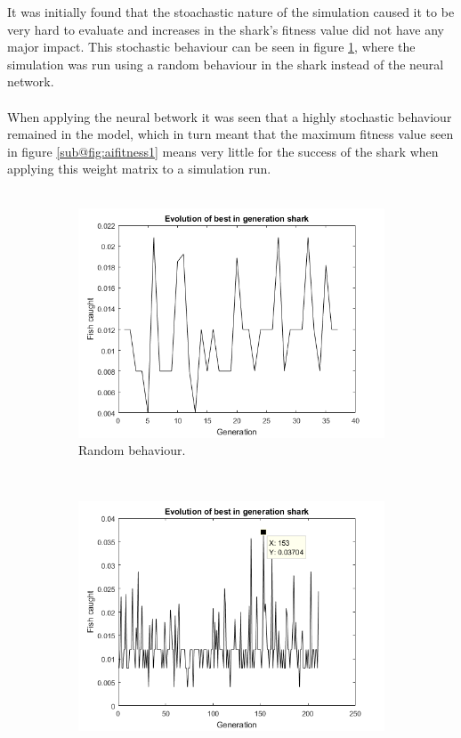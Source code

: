 It was initially found that the stoachastic nature of the simulation caused it
to be very hard to evaluate and increases in the shark's fitness value did not have any
major impact. This stochastic behaviour can be seen in figure
\ref{fig:walnutfitness}, where the simulation was run using a random behaviour
in the shark instead of the neural network.\\
\\
When applying the neural betwork it was seen that a highly stochastic
behaviour remained in the model, which in turn meant that the maximum fitness
value seen in figure \ref{sub@fig:aifitness1} means very little for the
success of the shark when applying this weight matrix to a simulation run.\\
\\
\begin{figure}[htp]
\begin{center}
\begin{subfigure}[b]{0.5\textwidth}
 \includegraphics[width=\textwidth]{figs/walnut.png}
 \caption[]{Random behaviour.}
 \label{fig:walnutfitness}
\end{subfigure}~
\begin{subfigure}[b]{0.5\textwidth}
 \includegraphics[width=\textwidth]{figs/aifitness1.png}

\end{subfigure}
\end{center}
\end{figure}
